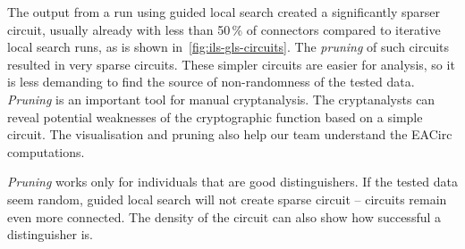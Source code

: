 \documentclass[
  print, %
  Table,   %
  nolof,     %
  nolot,     %
  11pt, %
  oneside  %
]{fithesis3}
\begin{document}
The output from a run using guided local search created a significantly sparser circuit, usually already with less than 50\,\% of connectors compared to iterative local search runs, as is shown in~\cref{fig:ils-gls-circuits}. The \textit{pruning} of such circuits resulted in very sparse circuits. These simpler circuits are easier for analysis, so it is less demanding to find the source of non-randomness of the tested data. \textit{Pruning} is an important tool for manual cryptanalysis. The cryptanalysts can reveal potential weaknesses of the cryptographic function based on a simple circuit. The visualisation and pruning also help our team understand the EACirc computations.

\textit{Pruning} works only for individuals that are good distinguishers. If the tested data seem random, guided local search will not create sparse circuit -- circuits remain even more connected. The density of the circuit can also show how successful a distinguisher is.
\end{document}
